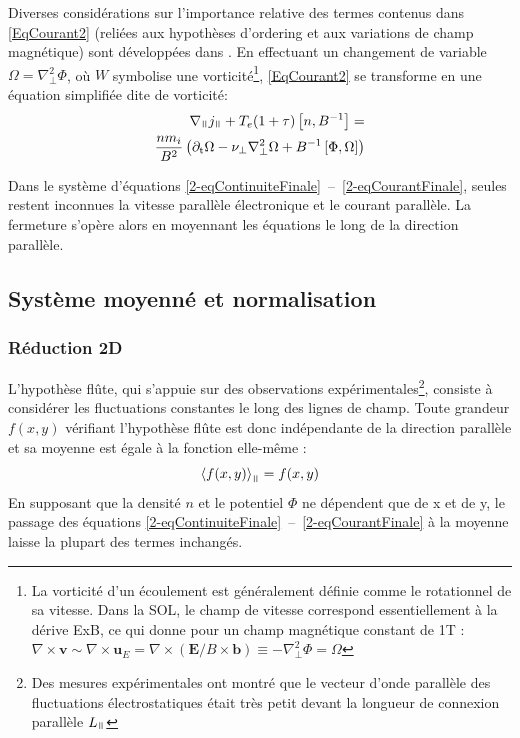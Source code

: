 \begin{refsection}
Diverses considérations sur l'importance relative des termes contenus dans
\eqref{EqCourant2} (reliées aux hypothèses d'ordering
et aux variations de champ magnétique) sont développées dans
\cite{SarazinPhD}. En effectuant un changement de variable
$\Omega=\nabla_\perp^2\Phi$, où $W$ symbolise une vorticité\footnote{La
vorticité d'un écoulement est généralement définie comme le rotationnel de sa vitesse. Dans la SOL, le champ de vitesse correspond essentiellement à la dérive ExB, ce qui donne pour un champ magnétique constant de 1T : 
$\nabla\times\mathbf{v}\sim\nabla\times\mathbf{u}_E=\nabla\times(\mathbf{E}/B\times\mathbf{b})\equiv-\nabla_\perp^2
\Phi=\Omega$ }, \eqref{EqCourant2} se transforme en une équation simplifiée dite
de vorticité:
\begin{equation}\begin{split}
\label{2-eqCourantFinale}
\nabla_\para{j}_\para +
T_e(1+\tau)\left[n,B\puissance{-1}\right] =\\
\frac{nm_i}{B^2}\left(\partial_\text{t}\Omega - \nu_\perp
\nabla_\perp^2\Omega+
B\puissance{-1}\left[\Phi,\Omega\right]\right)
\end{split}
\end{equation} 

 Dans le système d'équations
 \eqref{2-eqContinuiteFinale}~--~\eqref{2-eqCourantFinale}, seules restent
 inconnues la vitesse parallèle électronique  et le courant parallèle. La
 fermeture s'opère alors en moyennant les équations le long de la direction
 parallèle. 

\subsection{Système moyenné et normalisation}
\label{2-flute}
\subsubsection{Réduction 2D}

 L'hypothèse flûte, qui s'appuie sur des observations
expérimentales\footnote{Des mesures expérimentales ont montré que le vecteur
d'onde parallèle des fluctuations électrostatiques était très petit devant la
longueur de connexion parallèle $L_\para$\parencite{Wootton}}, consiste à
considérer les fluctuations constantes le long des lignes de champ. Toute grandeur $f(x,y)$
vérifiant l'hypothèse flûte est donc indépendante de la direction parallèle et
sa moyenne est égale à la fonction elle-même :
\begin{equation}
\left<f(x,y)\right>_\para=f(x,y)
\end{equation}
En supposant que la densité $n$ et le potentiel $\Phi$ ne dépendent que de x et
de y, le passage des équations
\eqref{2-eqContinuiteFinale}~--~\eqref{2-eqCourantFinale} à la moyenne laisse
la plupart des termes inchangés.


\end{refsection}
